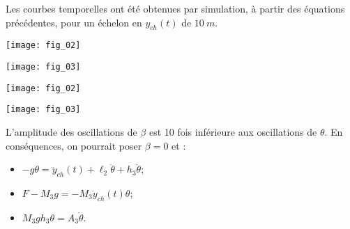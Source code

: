 \begin{multicols}{2}
\begin{corrige}
\end{corrige}
\else
\fi


Les courbes temporelles ont été obtenues par simulation, à partir des équations précédentes, pour un
échelon en $y_{ch}(t)$ de $\SI{10}{m}$. 

\ifprof
\begin{multicols}{2}
\begin{center}
\texttt{[image: fig\_02]}
\end{center}

\begin{center}
\texttt{[image: fig\_03]}
\end{center}
\end{multicols}
\else
\begin{center}
\texttt{[image: fig\_02]}
\end{center}

\begin{center}
\texttt{[image: fig\_03]}
\end{center}

\fi

\ifprof
\begin{corrige}
L'amplitude des oscillations de $\beta$ est 10 fois inférieure aux oscillations de $\theta$. En conséquences, on pourrait poser $\beta=0$ et :

\begin{itemize}
\item $ - g \theta  = \ddot{y}_{ch}(t) +\ell_2\ddot{\theta} +h_3\ddot{\theta} $;
\item  $F-M_3 g  = - M_3 \ddot{y}_{ch}(t) \theta  $;
 \item  $M_3gh_3 \theta =A_3 \ddot{\theta} $.
 \end{itemize}
 
\end{corrige}
\else
\fi




\end{multicols}
